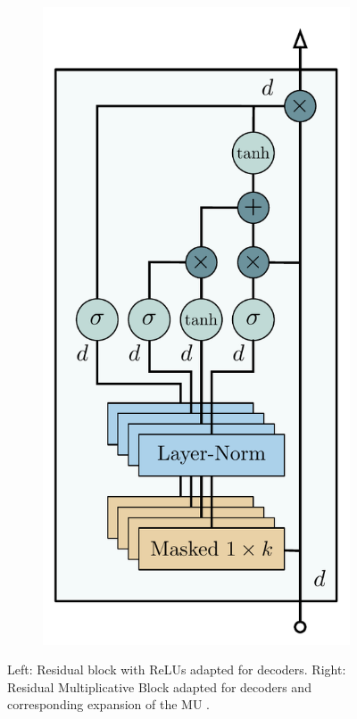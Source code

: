 \documentclass{article}
\begin{document}
\begin{figure}[t]
\begin{subfigure}{}
        \includegraphics[scale=.28]{blocks/masked_mu}
    \end{subfigure}
    \caption{Left: Residual block with ReLUs \citep{DBLP:journals/corr/HeZR016} adapted for decoders. Right: Residual Multiplicative Block adapted for decoders and corresponding expansion of the MU \citep{vpn}.}
    \label{fig:residual}
\vspace{-0.5cm}
\end{figure}
\end{document}
